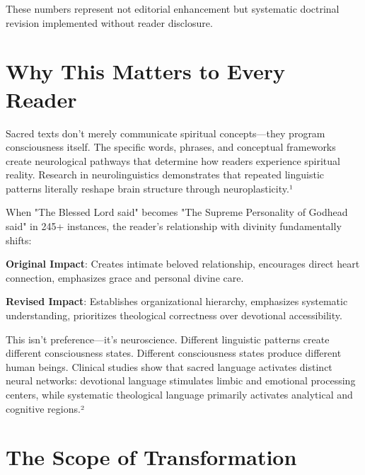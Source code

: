 \documentclass[11pt,twoside]{book}
\begin{document}
These numbers represent not editorial enhancement but systematic doctrinal revision implemented without reader disclosure.
\section*{Why This Matters to Every Reader}
\label{sec:orgcc78ccf}

Sacred texts don't merely communicate spiritual concepts—they program consciousness itself. The specific words, phrases, and conceptual frameworks create neurological pathways that determine how readers experience spiritual reality. Research in neurolinguistics demonstrates that repeated linguistic patterns literally reshape brain structure through neuroplasticity.¹

When "The Blessed Lord said" becomes "The Supreme Personality of Godhead said" in 245+ instances, the reader's relationship with divinity fundamentally shifts:

\begin{pullquotebox}
\textbf{Original Impact}: Creates intimate beloved relationship, encourages direct heart connection, emphasizes grace and personal divine care.

\textbf{Revised Impact}: Establishes organizational hierarchy, emphasizes systematic understanding, prioritizes theological correctness over devotional accessibility.
\end{pullquotebox}

This isn't preference—it's neuroscience. Different linguistic patterns create different consciousness states. Different consciousness states produce different human beings. Clinical studies show that sacred language activates distinct neural networks: devotional language stimulates limbic and emotional processing centers, while systematic theological language primarily activates analytical and cognitive regions.²
\section*{The Scope of Transformation}
\label{sec:org2f73caf}
\end{document}
